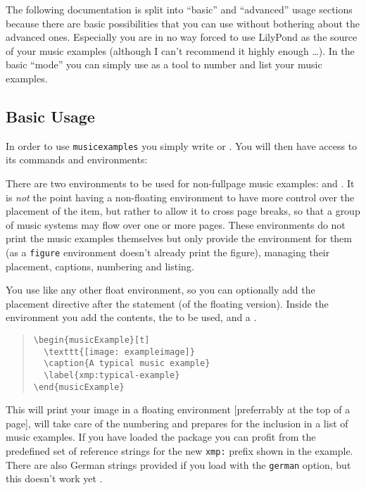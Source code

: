 \documentclass[../openLilyLib]{subfiles}
\begin{document}
The following documentation is split into “basic” and “advanced” usage sections because there are basic possibilities that you can use without bothering about the advanced ones.
Especially you are in no way forced to use LilyPond as the source of your music examples (although I can't recommend it highly enough \dots).
In the basic “mode” you can simply use  as a tool to number and list your music examples.

\subsection{Basic Usage}
\label{subsec:xmp_basic-usage}
In order to use \texttt{musicexamples} you simply write  or .
You will then have access to its commands and environments:

There are two environments to be used for non-fullpage music examples:  and .
It is \emph{not} the point having a non-floating environment to have more control over the placement of the item, but rather to allow it to cross page breaks, so that a group of music systems may flow over one or more pages. 
These environments do not print the music examples themselves but only provide the environment for them (as a \texttt{figure} environment doesn't already print the figure), managing their placement, captions, numbering and listing.

You use  like any other float environment, so you can optionally add the placement directive after the  statement (of the floating version).
Inside the environment you add the contents, the  to be used, and a .
\begin{quote}
\begin{verbatim}
\begin{musicExample}[t]
  \texttt{[image: exampleimage]}
  \caption{A typical music example}
  \label{xmp:typical-example}
\end{musicExample}
\end{verbatim}
\end{quote}

This will print your image in a floating environment [preferrably at the top of a page], will take care of the numbering and prepares for the inclusion in a list of music examples.
If you have loaded the  package you can profit from the predefined set of reference strings for the new \texttt{xmp:} prefix shown in the example.
There are also German strings provided if you load  with the \texttt{german} option, but this doesn't work yet .
\end{document}
